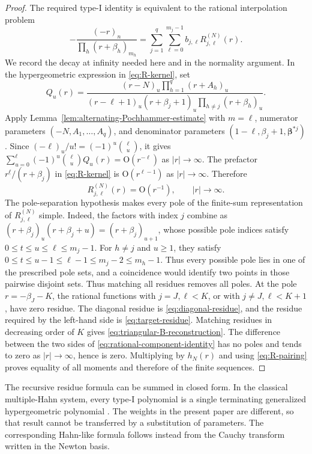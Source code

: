 \documentclass[10pt]{amsart}
\newcommand{\bbeta}{\boldsymbol\beta}
\newcommand{\abs}[1]{\lvert#1\rvert}
\newcommand{\fall}[2]{#1^{\underline{#2}}}
\theoremstyle{plain}
\theoremstyle{definition}
\theoremstyle{remark}
\begin{document}
\begin{proof}
The required type-I identity is equivalent
to the rational interpolation problem
\begin{equation}
 -\frac{(-r)_n}{\prod_h(r+\beta_h)_{m_h}}
 =\sum_{j=1}^q\sum_{\ell=0}^{m_j-1}
 b_{j,\ell}R_{j,\ell}^{(N)}(r).
 \label{eq:rational-component-identity}
\end{equation}
We record the decay at infinity needed here and in the normality argument.
In the hypergeometric expression in \eqref{eq:R-kernel}, set
\[
 Q_u(r)=
 \frac{(r-N)_u\prod_{h=1}^q(r+A_h)_u}
 {(r-\ell+1)_u(r+\beta_j+1)_u
  \prod_{h\ne j}(r+\beta_h)_u}.
\]
Apply Lemma~\ref{lem:alternating-Pochhammer-estimate} with \(m=\ell\),
numerator parameters \((-N,A_1,\ldots,A_q)\), and denominator parameters
\((1-\ell,\beta_j+1,\bbeta^{*j})\). Since
\((-\ell)_u/u!=(-1)^u\binom\ell u\), it gives
\(\sum_{u=0}^{\ell}(-1)^u\binom\ell u Q_u(r)
=\mathrm O(r^{-\ell})\) as \(|r|\to\infty\).
The prefactor \(\fall{r}{\ell}/(r+\beta_j)\) in \eqref{eq:R-kernel} is
\(\mathrm O(r^{\ell-1})\) as \(|r|\to\infty\). Therefore
\begin{equation}
 R_{j,\ell}^{(N)}(r)=\mathrm O(r^{-1}),
 \qquad |r|\to\infty.
 \label{eq:R-decay}
\end{equation}
The pole-separation hypothesis makes every pole of the finite-sum
representation of \(R_{j,\ell}^{(N)}\) simple. Indeed, the factors with
index \(j\) combine as
\((r+\beta_j)_u(r+\beta_j+u)=(r+\beta_j)_{u+1}\), whose possible pole
indices satisfy \(0\le t\le u\le\ell\le m_j-1\). For \(h\ne j\) and
\(u\ge1\), they satisfy
\(0\le t\le u-1\le\ell-1\le m_j-2\le m_h-1\).
Thus every possible pole lies in one of the prescribed pole sets, and a
coincidence would identify two points in those pairwise disjoint sets.
Thus matching all residues removes all poles.
At the pole \(r=-\beta_J-K\), the rational functions with
\(j=J,\ell<K\), or with
\(j\ne J,\ell<K+1\), have zero residue. The diagonal residue is
\eqref{eq:diagonal-residue}, and the residue required by the left-hand side is
\eqref{eq:target-residue}. Matching residues in decreasing order of \(K\)
gives \eqref{eq:triangular-B-reconstruction}. The difference between the
two sides of \eqref{eq:rational-component-identity} has no poles and tends
to zero as \(\abs r\to\infty\), hence is zero. Multiplying by \(h_N(r)\) and using
\eqref{eq:R-pairing} proves equality of all moments and therefore of the
finite sequences.
\end{proof}

The recursive residue formula can be summed in closed form. In the classical
multiple-Hahn system, every type-I polynomial is a single terminating
generalized hypergeometric polynomial
\cite[Theorem~2.1, equation~(21)]{BranquinhoDiazFoulquieManasWolfs2025}.
The weights in the present paper are different, so that result cannot be
transferred by a substitution of parameters. The corresponding Hahn-like
formula follows instead from the Cauchy transform written in the Newton
basis.
\end{document}
